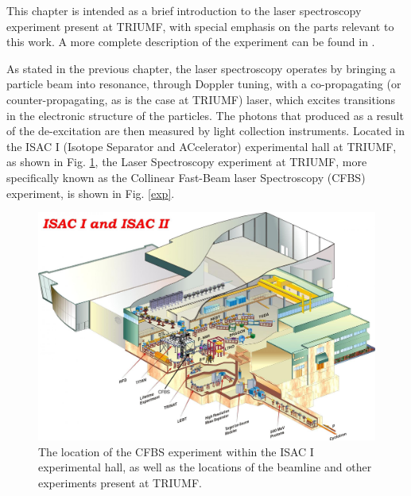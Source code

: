 \noindent This chapter is intended as a brief introduction to the laser spectroscopy experiment present at TRIUMF, with special emphasis on the parts relevant to this work. A more complete description of the experiment can be found in \cite{CFBS}.

As stated in the previous chapter, the laser spectroscopy operates by bringing a particle beam into resonance, through Doppler tuning, with a co-propagating (or counter-propagating, as is the case at TRIUMF) laser, which excites transitions in the electronic structure of the particles. The photons that produced as a result of the de-excitation are then measured by light collection instruments. Located in the ISAC I (Isotope Separator and ACcelerator) experimental hall at TRIUMF, as shown in Fig. \ref{loc}, the Laser Spectroscopy experiment at TRIUMF, more specifically known as the Collinear Fast-Beam laser Spectroscopy (CFBS) experiment, is shown in Fig. \ref{exp}. 


\begin{figure}[h]
\includegraphics[width=\textwidth]{Laser_spec_triumf/ISAC.png}
\caption[The location of the CFBS experiment]{\small The location of the CFBS experiment within the ISAC I experimental hall, as well as the locations of the beamline and other experiments present at TRIUMF.}
\label{loc}
\end{figure}

